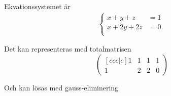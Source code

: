 \documentclass[../../main.tex]{subfiles}
\begin{document}
\begin{solution}{1}

Ekvationssystemet är 
\begin{align*}
    \begin{cases} 
     x+y+z&=1  \\
    x+2y+2z&=0.   \\
    \end{cases}
\end{align*}

Det kan representeras med totalmatrisen
\[
\begin{pmatrix}[ccc|c]
  1 & 1 & 1 & 1\\
  1 & 2 & 2 & 0
\end{pmatrix}
\]

Och kan lösas med gauss-eliminering

\end{solution}
\end{document}
